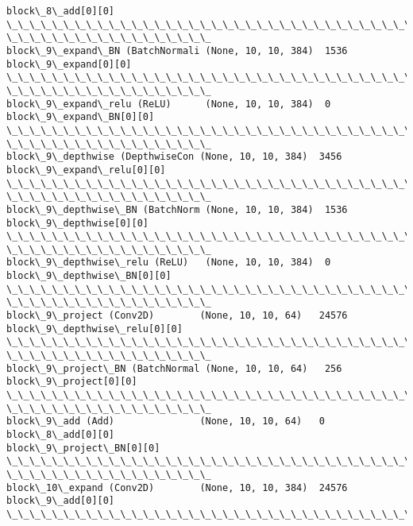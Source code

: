\documentclass[11pt]{article}
\begin{document}
\begin{Verbatim}[commandchars=\\\{\}]
block\_8\_add[0][0]
\_\_\_\_\_\_\_\_\_\_\_\_\_\_\_\_\_\_\_\_\_\_\_\_\_\_\_\_\_\_\_\_\_\_\_\_\_\_\_\_\_\_\_\_\_\_\_\_\_\_\_\_\_\_\_\_\_\_\_\_\_\_\_\_\_\_\_\_\_\_\_\_\_\_\_\_\_\_\_\_
\_\_\_\_\_\_\_\_\_\_\_\_\_\_\_\_\_\_
block\_9\_expand\_BN (BatchNormali (None, 10, 10, 384)  1536
block\_9\_expand[0][0]
\_\_\_\_\_\_\_\_\_\_\_\_\_\_\_\_\_\_\_\_\_\_\_\_\_\_\_\_\_\_\_\_\_\_\_\_\_\_\_\_\_\_\_\_\_\_\_\_\_\_\_\_\_\_\_\_\_\_\_\_\_\_\_\_\_\_\_\_\_\_\_\_\_\_\_\_\_\_\_\_
\_\_\_\_\_\_\_\_\_\_\_\_\_\_\_\_\_\_
block\_9\_expand\_relu (ReLU)      (None, 10, 10, 384)  0
block\_9\_expand\_BN[0][0]
\_\_\_\_\_\_\_\_\_\_\_\_\_\_\_\_\_\_\_\_\_\_\_\_\_\_\_\_\_\_\_\_\_\_\_\_\_\_\_\_\_\_\_\_\_\_\_\_\_\_\_\_\_\_\_\_\_\_\_\_\_\_\_\_\_\_\_\_\_\_\_\_\_\_\_\_\_\_\_\_
\_\_\_\_\_\_\_\_\_\_\_\_\_\_\_\_\_\_
block\_9\_depthwise (DepthwiseCon (None, 10, 10, 384)  3456
block\_9\_expand\_relu[0][0]
\_\_\_\_\_\_\_\_\_\_\_\_\_\_\_\_\_\_\_\_\_\_\_\_\_\_\_\_\_\_\_\_\_\_\_\_\_\_\_\_\_\_\_\_\_\_\_\_\_\_\_\_\_\_\_\_\_\_\_\_\_\_\_\_\_\_\_\_\_\_\_\_\_\_\_\_\_\_\_\_
\_\_\_\_\_\_\_\_\_\_\_\_\_\_\_\_\_\_
block\_9\_depthwise\_BN (BatchNorm (None, 10, 10, 384)  1536
block\_9\_depthwise[0][0]
\_\_\_\_\_\_\_\_\_\_\_\_\_\_\_\_\_\_\_\_\_\_\_\_\_\_\_\_\_\_\_\_\_\_\_\_\_\_\_\_\_\_\_\_\_\_\_\_\_\_\_\_\_\_\_\_\_\_\_\_\_\_\_\_\_\_\_\_\_\_\_\_\_\_\_\_\_\_\_\_
\_\_\_\_\_\_\_\_\_\_\_\_\_\_\_\_\_\_
block\_9\_depthwise\_relu (ReLU)   (None, 10, 10, 384)  0
block\_9\_depthwise\_BN[0][0]
\_\_\_\_\_\_\_\_\_\_\_\_\_\_\_\_\_\_\_\_\_\_\_\_\_\_\_\_\_\_\_\_\_\_\_\_\_\_\_\_\_\_\_\_\_\_\_\_\_\_\_\_\_\_\_\_\_\_\_\_\_\_\_\_\_\_\_\_\_\_\_\_\_\_\_\_\_\_\_\_
\_\_\_\_\_\_\_\_\_\_\_\_\_\_\_\_\_\_
block\_9\_project (Conv2D)        (None, 10, 10, 64)   24576
block\_9\_depthwise\_relu[0][0]
\_\_\_\_\_\_\_\_\_\_\_\_\_\_\_\_\_\_\_\_\_\_\_\_\_\_\_\_\_\_\_\_\_\_\_\_\_\_\_\_\_\_\_\_\_\_\_\_\_\_\_\_\_\_\_\_\_\_\_\_\_\_\_\_\_\_\_\_\_\_\_\_\_\_\_\_\_\_\_\_
\_\_\_\_\_\_\_\_\_\_\_\_\_\_\_\_\_\_
block\_9\_project\_BN (BatchNormal (None, 10, 10, 64)   256
block\_9\_project[0][0]
\_\_\_\_\_\_\_\_\_\_\_\_\_\_\_\_\_\_\_\_\_\_\_\_\_\_\_\_\_\_\_\_\_\_\_\_\_\_\_\_\_\_\_\_\_\_\_\_\_\_\_\_\_\_\_\_\_\_\_\_\_\_\_\_\_\_\_\_\_\_\_\_\_\_\_\_\_\_\_\_
\_\_\_\_\_\_\_\_\_\_\_\_\_\_\_\_\_\_
block\_9\_add (Add)               (None, 10, 10, 64)   0
block\_8\_add[0][0]
block\_9\_project\_BN[0][0]
\_\_\_\_\_\_\_\_\_\_\_\_\_\_\_\_\_\_\_\_\_\_\_\_\_\_\_\_\_\_\_\_\_\_\_\_\_\_\_\_\_\_\_\_\_\_\_\_\_\_\_\_\_\_\_\_\_\_\_\_\_\_\_\_\_\_\_\_\_\_\_\_\_\_\_\_\_\_\_\_
\_\_\_\_\_\_\_\_\_\_\_\_\_\_\_\_\_\_
block\_10\_expand (Conv2D)        (None, 10, 10, 384)  24576
block\_9\_add[0][0]
\_\_\_\_\_\_\_\_\_\_\_\_\_\_\_\_\_\_\_\_\_\_\_\_\_\_\_\_\_\_\_\_\_\_\_\_\_\_\_\_\_\_\_\_\_\_\_\_\_\_\_\_\_\_\_\_\_\_\_\_\_\_\_\_\_\_\_\_\_\_\_\_\_\_\_\_\_\_\_\_

\end{Verbatim}
\end{document}
